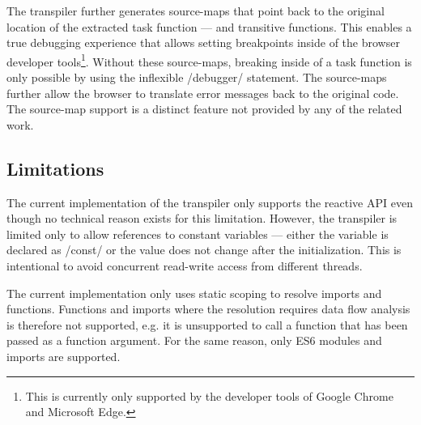 The transpiler further generates source-maps that point back to the original location of the extracted task function --- and transitive functions. This enables a true debugging experience that allows setting breakpoints inside of the browser developer tools\footnote{This is currently only supported by the developer tools of Google Chrome and Microsoft Edge.}. Without these source-maps, breaking inside of a task function is only possible by using the inflexible \javascriptinline/debugger/ statement. The source-maps further allow the browser to translate error messages back to the original code. The source-map support is a distinct feature not provided by any of the related work.

\subsection{Limitations}
The current implementation of the transpiler only supports the reactive API even though no technical reason exists for this limitation. However, the transpiler is limited only to allow references to constant variables --- either the variable is declared as \javascriptinline/const/ or the value does not change after the initialization. This is intentional to avoid concurrent read-write access from different threads. 

The current implementation only uses static scoping to resolve imports and functions. Functions and imports where the resolution requires data flow analysis is therefore not supported, e.g. it is unsupported to call a function that has been passed as a function argument. For the same reason, only ES6 modules and imports are supported.
